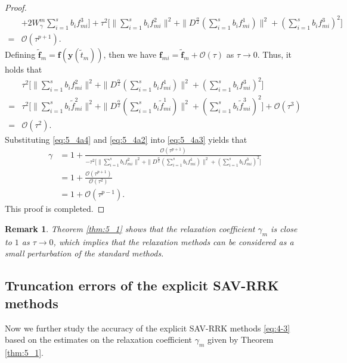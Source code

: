 \documentclass[preprint,compress,3p,10pt,fleqn]{elsarticle}
\numberwithin{equation}{section}
\newtheorem{remark}[theorem]{Remark}
\begin{document}
\begin{proof}
\begin{align}
	&+2W_{\gamma}^{m}\sum\limits_{i=1}^{s}b_if_{mi}^3\Big]+\tau^2\Big[\|\sum\limits_{i=1}^{s}b_if_{mi}^2\|^2+ \|D^\frac{\alpha}{2}(\sum\limits_{i=1}^{s}b_if_{mi}^1)\|^2+(\sum\limits_{i=1}^{s}b_if_{mi}^3)^2\Big]\nonumber\\
	=&\mathcal{O}(\tau^{p+1}).
	\end{align}
Defining $\tilde{\bm{f}}_m=\bm{f}\left(\bm{y}\left(\tilde{t}_m\right)\right)$, then we have $\bm{f}_{m i}=\tilde{\bm{f}}_m+\mathcal{O}(\tau)$ as $\tau\rightarrow 0$.
Thus, it holds that
\begin{align}\label{eq:5_4a4}
	&\tau^2\Big[\|\sum\limits_{i=1}^{s}b_if_{mi}^2\|^2+ \|D^\frac{\alpha}{2}(\sum\limits_{i=1}^{s}b_if_{mi}^1)\|^2+(\sum\limits_{i=1}^{s}b_if_{mi}^3)^2\Big]\nonumber\\
	=&\tau^2\Big[\|\sum\limits_{i=1}^{s}b_i\tilde{f}_{mi}^2\|^2+ \|D^\frac{\alpha}{2}(\sum\limits_{i=1}^{s}b_i\tilde{f}_{mi}^1)\|^2+(\sum\limits_{i=1}^{s}b_i\tilde{f}_{mi}^3)^2\Big]+\mathcal{O}(\tau^3)\nonumber\\
	=&\mathcal{O}(\tau^2).
	\end{align}
Substituting \eqref{eq:5_4a4} and \eqref{eq:5_4a2} into \eqref{eq:5_4a3} yields that
\begin{align}\label{eq:5_4a5}
	\gamma&=1+\frac{\mathcal{O}(\tau^{p+1})}{-\tau^2\Big[\|\sum\limits_{i=1}^{s}b_if_{mi}^2\|^2+ \|D^\frac{\alpha}{2}(\sum\limits_{i=1}^{s}b_if_{mi}^1)\|^2+(\sum\limits_{i=1}^{s}b_if_{mi}^3)^2\Big]}\nonumber\\
	&=1+\frac{\mathcal{O}(\tau^{p+1})}{\mathcal{O}(\tau^2)}\nonumber\\
	&=1+\mathcal{O}(\tau^{p-1}).
	\end{align}
	This proof is completed.
	\end{proof}

\begin{remark}\label{rk:5_1}
Theorem \ref{thm:5_1} shows that the relaxation coefficient $\gamma_m$ is close to $1$ as $\tau\rightarrow 0$,
which implies that the relaxation methods can be considered as a small perturbation of the standard methods.
\end{remark}
	
\subsection{Truncation errors of the explicit SAV-RRK methods}
Now we further study the accuracy of the explicit SAV-RRK methods \eqref{eq:4-3} based on the estimates on the relaxation coefficient $\gamma_m$ given by Theorem \ref{thm:5_1}.
	
\end{document}
